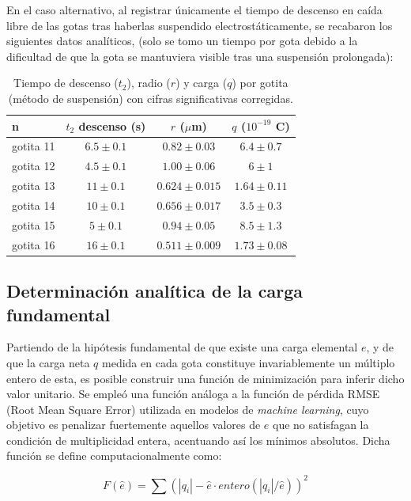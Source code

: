 \documentclass[9pt,a4paper,twocolumn,twoside]{rho-class/rho}
\begin{document}
En el caso alternativo, al registrar únicamente el tiempo de descenso en caída libre de las gotas tras haberlas suspendido electrostáticamente, se recabaron los siguientes datos analíticos, (solo se tomo un tiempo por gota debido a la dificultad de que la gota se mantuviera visible tras una suspensión prolongada):

\begin{table}[hbt!]
\centering
\begin{tabular}{lccc}
\hline
n & $t_2$ descenso (s) & $r$ ($\mu$m) & $q$ ($10^{-19}$ C) \\
\hline
gotita 11 & $6.5 \pm 0.1$ & $0.82 \pm 0.03$   & $6.4 \pm 0.7$ \\
gotita 12 & $4.5 \pm 0.1$ & $1.00 \pm 0.06$   & $6 \pm 1$     \\
gotita 13 & $11 \pm 0.1$  & $0.624 \pm 0.015$ & $1.64 \pm 0.11$ \\
gotita 14 & $10 \pm 0.1$  & $0.656 \pm 0.017$ & $3.5 \pm 0.3$ \\
gotita 15 & $5 \pm 0.1$   & $0.94 \pm 0.05$   & $8.5 \pm 1.3$ \\
gotita 16 & $16 \pm 0.1$  & $0.511 \pm 0.009$ & $1.73 \pm 0.08$ \\
\hline
\end{tabular}
\vspace{0.1cm}
\caption{Tiempo de descenso ($t_2$), radio ($r$) y carga ($q$) por gotita (método de suspensión) con cifras significativas corregidas.}
\label{tab:datos_suspension_redondeados}
\end{table}

\subsection{Determinación analítica de la carga fundamental}

Partiendo de la hipótesis fundamental de que existe una carga elemental $e$, y de que la carga neta $q$ medida en cada gota constituye invariablemente un múltiplo entero de esta, es posible construir una función de minimización para inferir dicho valor unitario. Se empleó una función análoga a la función de pérdida RMSE (Root Mean Square Error) utilizada en modelos de \textit{machine learning}, cuyo objetivo es penalizar fuertemente aquellos valores de $e$ que no satisfagan la condición de multiplicidad entera, acentuando así los mínimos absolutos. Dicha función se define computacionalmente como:

\begin{equation}
F(\hat{e}) = \sum \left( |q_i| - \hat{e} \cdot \textit{entero}(|q_i|/\hat{e}) \right)^2
\end{equation}
\end{document}
